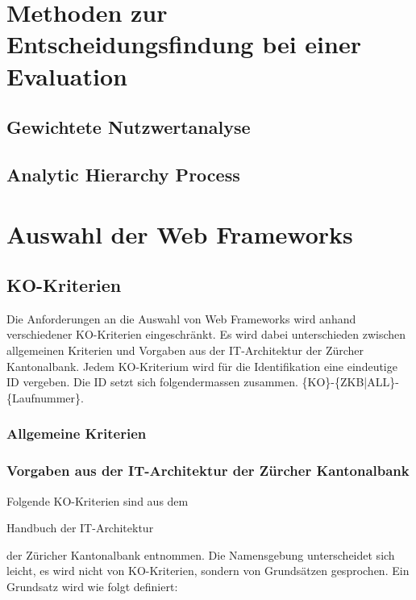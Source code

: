 \documentclass[
11pt, %
a4paper, %
BCOR25mm, %
DIV14, %
footsepline = false, %
headsepline, %
twoside, %
openright,
abstracton, %
listof=totocnumbered, %
bibliography=totocnumbered %
]{scrreprt}
\begin{document}
  \section{Methoden zur Entscheidungsfindung bei einer Evaluation}
  
  \subsection{Gewichtete Nutzwertanalyse}
    
  \subsection{Analytic Hierarchy Process}
    
  \section{Auswahl der Web Frameworks}
    
  \subsection{KO-Kriterien}
  
  Die Anforderungen an die Auswahl von Web Frameworks wird anhand verschiedener
  KO-Kriterien eingeschränkt. Es wird dabei unterschieden zwischen allgemeinen
  Kriterien und Vorgaben aus der IT-Architektur der Zürcher Kantonalbank. Jedem
  KO-Kriterium wird für die Identifikation eine eindeutige ID vergeben. Die ID
  setzt sich folgendermassen zusammen. \{KO\}-\{ZKB|ALL\}-\{Laufnummer\}.
  
  \subsubsection{Allgemeine Kriterien}
  
  \subsubsection{Vorgaben aus der IT-Architektur der Zürcher Kantonalbank}
  
  Folgende KO-Kriterien sind aus dem \begin{itshape}Handbuch der
  IT-Architektur\end{itshape}\cite{ZkbHandbuchDerItArchitektur} der Züricher
  Kantonalbank entnommen. Die Namensgebung unterscheidet sich leicht, es wird
  nicht von KO-Kriterien, sondern von Grundsätzen gesprochen. Ein Grundsatz
  wird wie folgt definiert:\\
  
\end{document}
